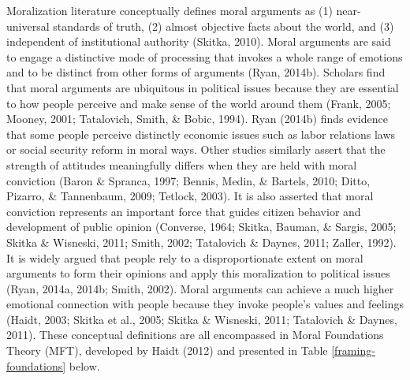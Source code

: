 \documentclass[12pt,econ]{sources/authesis}
\makeatletter
\def\caption{\refstepcounter\@captype \@dblarg{\@caption\@captype}}
\makeatother
\begin{document}
Moralization literature conceptually defines moral arguments as (1) near-universal standards of truth, (2) almost objective facts about the world, and (3) independent of institutional authority (Skitka, 2010).
Moral arguments are said to engage a distinctive mode of processing that invokes a whole range of emotions and to be distinct from other forms of arguments (Ryan, 2014b).
Scholars find that moral arguments are ubiquitous in political issues because they are essential to how people perceive and make sense of the world around them (Frank, 2005; Mooney, 2001; Tatalovich, Smith, \& Bobic, 1994).
Ryan (2014b) finds evidence that some people perceive distinctly economic issues such as labor relations laws or social security reform in moral ways.
Other studies similarly assert that the strength of attitudes meaningfully differs when they are held with moral conviction (Baron \& Spranca, 1997; Bennis, Medin, \& Bartels, 2010; Ditto, Pizarro, \& Tannenbaum, 2009; Tetlock, 2003).
It is also asserted that moral conviction represents an important force that guides citizen behavior and development of public opinion (Converse, 1964; Skitka, Bauman, \& Sargis, 2005; Skitka \& Wisneski, 2011; Smith, 2002; Tatalovich \& Daynes, 2011; Zaller, 1992).
It is widely argued that people rely to a disproportionate extent on moral arguments to form their opinions and apply this moralization to political issues (Ryan, 2014a, 2014b; Smith, 2002).
Moral arguments can achieve a much higher emotional connection with people because they invoke people's values and feelings (Haidt, 2003; Skitka et al., 2005; Skitka \& Wisneski, 2011; Tatalovich \& Daynes, 2011).
These conceptual definitions are all encompassed in Moral Foundations Theory (MFT), developed by Haidt (2012) and presented in Table \ref{framing-foundations} below.
\begin{table}[ht]
\caption{Foundations of Moral Arguments}
\centering
{}
\label{framing-foundations}
\end{table}
\end{document}
